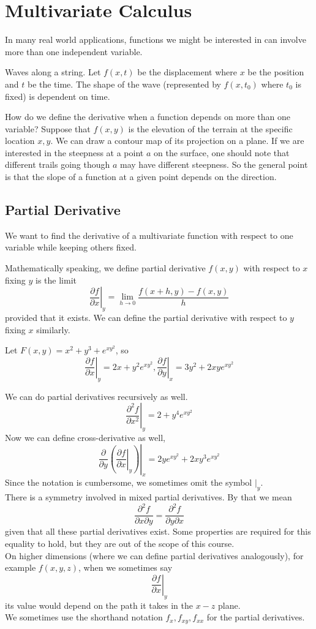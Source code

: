\section{Multivariate Calculus}
In many real world applications, functions we might be interested in can involve more than one independent variable.
\begin{example}
    Waves along a string.
    Let $f(x,t)$ be the displacement where $x$ be the position and $t$ be the time.
    The shape of the wave (represented by $f(x,t_0)$ where $t_0$ is fixed) is dependent on time.
\end{example}
How do we define the derivative when a function depends on more than one variable?
Suppose that $f(x,y)$ is the elevation of the terrain at the specific location $x,y$.
We can draw a contour map of its projection on a plane.
If we are interested in the steepness at a point $a$ on the surface, one should note that different trails going though $a$ may have different steepness.
So the general point is that the slope of a function at a given point depends on the direction.
\subsection{Partial Derivative}
We want to find the derivative of a multivariate function with respect to one variable while keeping others fixed.
\begin{definition}
    Mathematically speaking, we define partial derivative $f(x,y)$ with respect to $x$ fixing $y$ is the limit
    $$\left.\frac{\partial f}{\partial x}\right|_y=\lim_{h\to0}\frac{f(x+h,y)-f(x,y)}{h}$$
    provided that it exists.
    We can define the partial derivative with respect to $y$ fixing $x$ similarly.
\end{definition}
\begin{example}
    Let $F(x,y)=x^2+y^3+e^{xy^2}$, so
    $$\left.\frac{\partial f}{\partial x}\right|_y=2x+y^2e^{xy^2},\left.\frac{\partial f}{\partial y}\right|_x=3y^2+2xye^{xy^2}$$
\end{example}
We can do partial derivatives recursively as well.
$$\left.\frac{\partial^2 f}{\partial x^2}\right|_y=2+y^4e^{xy^2}$$
Now we can define cross-derivative as well,
$$\left.\frac{\partial}{\partial y}\left(\left.\frac{\partial f}{\partial x}\right|_y\right)\right|_x=2ye^{xy^2}+2xy^3e^{xy^2}$$
Since the notation is cumbersome, we sometimes omit the symbol $|_y$.\\
There is a symmetry involved in mixed partial derivatives.
By that we mean
$$\frac{\partial^2 f}{\partial x\partial y}=\frac{\partial^2 f}{\partial y\partial x}$$
given that all these partial derivatives exist.
Some properties are required for this equality to hold, but they are out of the scope of this course.\\
On higher dimensions (where we can define partial derivatives analogously), for example $f(x,y,z)$, when we sometimes say
$$\left.\frac{\partial f}{\partial x}\right|_y$$
its value would depend on the path it takes in the $x-z$ plane.\\
We sometimes use the shorthand notation $f_x,f_{xy},f_{xx}$ for the partial derivatives.
